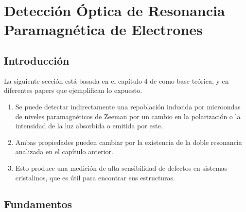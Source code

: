 \documentclass[aps,rmp,reprint,longbibliography]{revtex4-1}
\begin{document}
\section{Detección Óptica de Resonancia Paramagnética de Electrones}
\subsection{Introducción}
La siguiente sección está basada en el capítulo 4 de \cite{b1} como base teórica, y en diferentes papers que ejemplifican lo expuesto. 
\begin{enumerate}
\item Se puede detectar indirectamente una repoblación inducida por microondas de niveles paramagnéticos de Zeeman por un cambio en la polarización o la intensidad de la luz absorbida o emitida por este. 
\item Ambas propiedades pueden cambiar por la existencia de la doble resonancia analizada en el capítulo anterior.
\item Esto produce una medición de alta sensibilidad de defectos en sistemas cristalinos, que es útil para encontrar sus estructuras.
\end{enumerate}
\subsection{Fundamentos}
\end{document}
